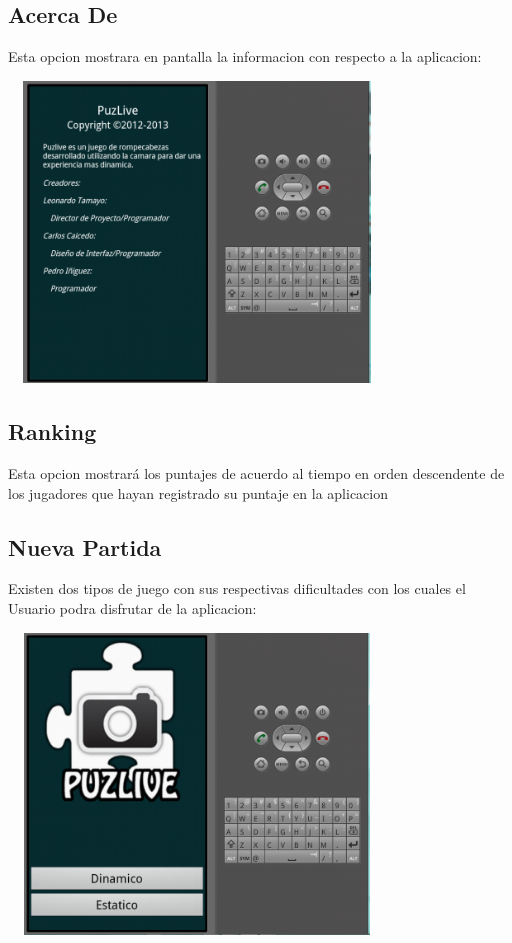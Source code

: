 \documentclass[10pt]{article}
\begin{document}
	\subsection{Acerca De}
		Esta opcion mostrara en pantalla la informacion con respecto a la aplicacion:
		\begin{center}
		\includegraphics[height=8cm,width=10cm]{acerca.png}
		\end{center}	
		
	\subsection{Ranking}
		Esta opcion mostrar\'a los puntajes de acuerdo al tiempo en orden descendente de los jugadores que hayan registrado su puntaje en la aplicacion

	\subsection{Nueva Partida}
		Existen dos tipos de juego con sus respectivas dificultades con los cuales el Usuario podra disfrutar de la aplicacion:
		\begin{center}
		\includegraphics[height=8cm,width=10cm]{dosgame.png}
		\end{center}	
\end{document}
